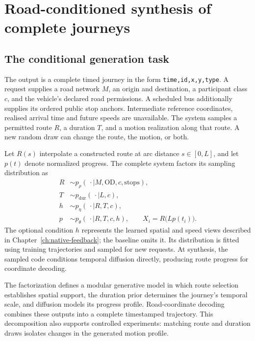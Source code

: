 \chapter{Road-conditioned synthesis of complete journeys}
\label{ch:native-method}

\section{The conditional generation task}
The output is a complete timed journey in the form \texttt{time,id,x,y,type}. A request supplies a road network $M$, an origin and destination, a participant class $c$, and the vehicle's declared road permissions. A scheduled bus additionally supplies its ordered public stop anchors. Intermediate reference coordinates, realised arrival time and future speeds are unavailable. The system samples a permitted route $R$, a duration $T$, and a motion realization along that route. A new random draw can change the route, the motion, or both.

Let $R(s)$ interpolate a constructed route at arc distance $s\in[0,L]$, and let $p(t)$ denote normalized progress. The complete system factors its sampling distribution as
\begin{align}
 R&\sim p_{\rho}(\,\cdot\mid M,\mathrm{OD},c,\mathrm{stops}),\nonumber\\
 T&\sim p_{\mathrm{dur}}(\,\cdot\mid L,c),\nonumber\\
 h&\sim p_{\eta}(\,\cdot\mid R,T,c),\nonumber\\
 p&\sim p_{\theta}(\,\cdot\mid R,T,c,h),\qquad
 X_i=R\bigl(Lp(t_i)\bigr).
 \label{eq:native-factorization}
\end{align}
The optional condition $h$ represents the learned spatial and speed views described in Chapter~\ref{ch:native-feedback}; the baseline omits it. Its distribution is fitted using training trajectories and sampled for new requests. At synthesis, the sampled code conditions temporal diffusion directly, producing route progress for coordinate decoding.

The factorization defines a modular generative model in which route selection establishes spatial support, the duration prior determines the journey's temporal scale, and diffusion models its progress profile. Road-coordinate decoding combines these outputs into a complete timestamped trajectory. This decomposition also supports controlled experiments: matching route and duration draws isolates changes in the generated motion profile.

